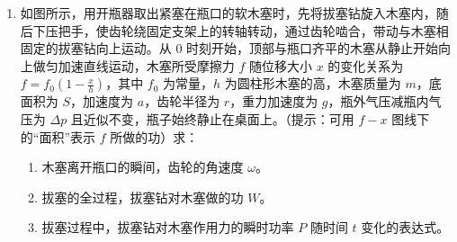 \documentclass[\gkver]{gaokaozhenti}
\begin{document}
\begin{enumerate}
{根据玻意耳定律 $p_{0}V = p'V'$

可得此时上方铸型室液面高为 $h_{3} = 0.04 \Um$ 时气体的压强为 $p' = 1.25 \times 10^{5} \UPa$

同理根据体积关系 $S_{1}h_{3} = S_{2}h_{4}$

可得 $h_{4} = 0.01 \Um$

此时下方气室内气体压强 $p_{2} = p' + \rho g(H + h_{3} + h_{4})$

代入数据可得 $p_{2} = 1.35\times10^{5} \UPa$
}

\item
如图所示，用开瓶器取出紧塞在瓶口的软木塞时，先将拔塞钻旋入木塞内，随后下压把手，使齿轮绕固定支架上的转轴转动，通过齿轮啮合，带动与木塞相固定的拔塞钻向上运动。从 0 时刻开始，顶部与瓶口齐平的木塞从静止开始向上做匀加速直线运动，木塞所受摩擦力 $f$ 随位移大小 $x$ 的变化关系为 $f = f_{0}(1 - \frac{x}{h})$，其中 $f_{0}$ 为常量，$h$ 为圆柱形木塞的高，木塞质量为 $m$，底面积为 $S$，加速度为 $a$，齿轮半径为 $r$，重力加速度为 $g$，瓶外气压减瓶内气压为 $\Delta p$ 且近似不变，瓶子始终静止在桌面上。（提示：可用 $f-x$ 图线下的“面积”表示 $f$ 所做的功）求：

\begin{enumerate}
\item
木塞离开瓶口的瞬间，齿轮的角速度 $\omega$。
\item
拔塞的全过程，拔塞钻对木塞做的功 $W$。
\item
拔塞过程中，拔塞钻对木塞作用力的瞬时功率 $P$ 随时间 $t$ 变化的表达式。
\end{enumerate}


\end{enumerate}
\end{document}
